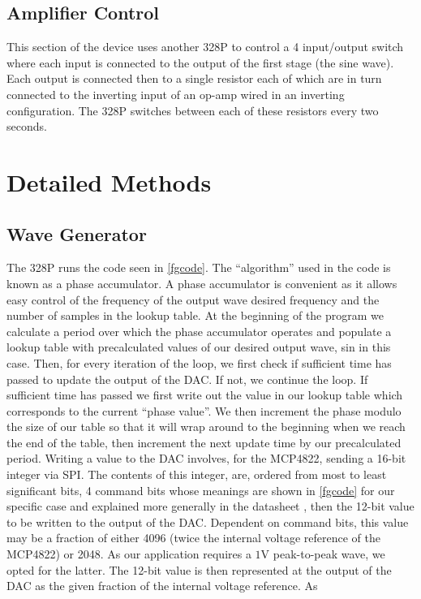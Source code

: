 \documentclass[10pt]{article}
\theoremstyle{definition}
\begin{document}
\subsection{Amplifier Control}
This section of the device uses another 328P to control a 4 input/output switch where each input is connected
to the output of the first stage (the sine wave). Each output is connected then to a single resistor each
of which are in turn connected to the inverting input of an op-amp wired in an inverting configuration. The 328P
switches between each of these resistors every two seconds.
\section{Detailed Methods}
\subsection{Wave Generator}
The 328P runs the code seen in \ref{fgcode}. The ``algorithm'' used in the code is known as a phase accumulator.
A phase accumulator is convenient as it allows easy control of the frequency of the output wave desired frequency and
the number of samples in the lookup table.
At the beginning of the program we calculate a period over which the phase accumulator operates
and populate a lookup table with precalculated values of our desired output wave, sin in this case.
Then, for every iteration of the loop, we first check if sufficient time has passed to update the output of the DAC.
If not, we continue the loop. If sufficient time has passed
we first write out the value in our lookup table which corresponds to the current ``phase value''. We
then increment the phase modulo the size of our table so that it will wrap around to the beginning
when we reach the end of the table, then increment the next update time by our precalculated period.
Writing a value to the DAC involves, for the MCP4822, sending a 16-bit integer via SPI.
The contents of this integer, are, ordered from most to least significant bits,
4 command bits whose meanings are shown in \ref{fgcode} for our specific case and explained more generally
in the datasheet \cite{microchip:MCP4822}, then the 12-bit value to be written to the output of the DAC. Dependent
on command bits, this value may be a fraction of either 4096 (twice the internal voltage reference of the MCP4822)
or 2048. As our application requires a $1\unit{\volt}$ peak-to-peak wave, we opted for the latter. The 12-bit value
is then represented at the output of the DAC as the given fraction of the internal voltage reference. As
\end{document}
